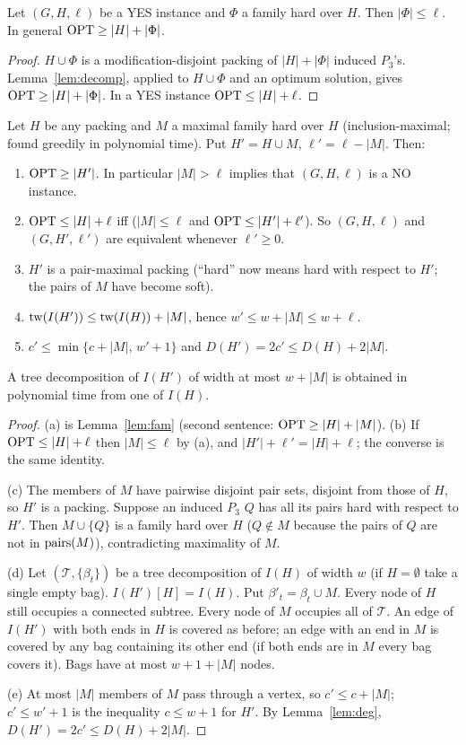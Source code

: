 \begin{lemma}\label{lem:fam}
Let $(G,H,\ell)$ be a YES instance and $\Phi$ a family hard over $H$. Then $|\Phi|\le\ell$. In general $\mathrm{OPT}\ge|H|+|\Phi|$.
\end{lemma}
\begin{proof}
$H\cup\Phi$ is a modification-disjoint packing of $|H|+|\Phi|$ induced $P_3$'s. Lemma~\ref{lem:decomp}, applied to $H\cup\Phi$ and an optimum solution, gives $\mathrm{OPT}\ge|H|+|\Phi|$. In a YES instance $\mathrm{OPT}\le|H|+\ell$.
\end{proof}

\begin{lemma}[Maximalisation]\label{lem:MAX}
Let $H$ be any packing and $M$ a maximal family hard over $H$ (inclusion-maximal; found greedily in polynomial time). Put $H'=H\cup M$, $\ell'=\ell-|M|$. Then:
\begin{enumerate}
\item[(a)] $\mathrm{OPT}\ge|H'|$. In particular $|M|>\ell$ implies that $(G,H,\ell)$ is a NO instance.
\item[(b)] $\mathrm{OPT}\le|H|+\ell$ iff ($|M|\le\ell$ and $\mathrm{OPT}\le|H'|+\ell'$). So $(G,H,\ell)$ and $(G,H',\ell')$ are equivalent whenever $\ell'\ge0$.
\item[(c)] $H'$ is a pair-maximal packing (``hard'' now means hard with respect to $H'$; the pairs of $M$ have become soft).
\item[(d)] $\mathrm{tw}(I(H'))\le\mathrm{tw}(I(H))+|M|$, hence $w'\le w+|M|\le w+\ell$.
\item[(e)] $c'\le\min\{c+|M|,\,w'+1\}$ and $D(H')=2c'\le D(H)+2|M|$.
\end{enumerate}
A tree decomposition of $I(H')$ of width at most $w+|M|$ is obtained in polynomial time from one of $I(H)$.
\end{lemma}
\begin{proof}
(a) is Lemma~\ref{lem:fam} (second sentence: $\mathrm{OPT}\ge|H|+|M|$). (b) If $\mathrm{OPT}\le|H|+\ell$ then $|M|\le\ell$ by (a), and $|H'|+\ell'=|H|+\ell$; the converse is the same identity.

(c) The members of $M$ have pairwise disjoint pair sets, disjoint from those of $H$, so $H'$ is a packing. Suppose an induced $P_3$ $Q$ has all its pairs hard with respect to $H'$. Then $M\cup\{Q\}$ is a family hard over $H$ ($Q\notin M$ because the pairs of $Q$ are not in $\mathrm{pairs}(M)$), contradicting maximality of $M$.

(d) Let $(\mathcal T,\{\beta_t\})$ be a tree decomposition of $I(H)$ of width $w$ (if $H=\emptyset$ take a single empty bag). $I(H')[H]=I(H)$. Put $\beta'_t=\beta_t\cup M$. Every node of $H$ still occupies a connected subtree. Every node of $M$ occupies all of $\mathcal T$. An edge of $I(H')$ with both ends in $H$ is covered as before; an edge with an end in $M$ is covered by any bag containing its other end (if both ends are in $M$ every bag covers it). Bags have at most $w+1+|M|$ nodes.

(e) At most $|M|$ members of $M$ pass through a vertex, so $c'\le c+|M|$; $c'\le w'+1$ is the inequality $c\le w+1$ for $H'$. By Lemma~\ref{lem:deg}, $D(H')=2c'\le D(H)+2|M|$.
\end{proof}
